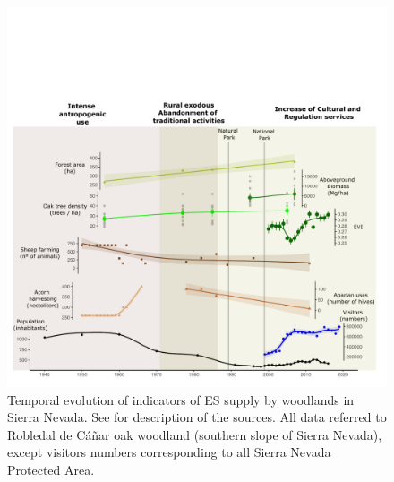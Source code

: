\begin{figure}
    \centering
    \includegraphics[width=.8\textwidth]{img/es/es-temporal_evolution_modified_v1.pdf}
    \caption{Temporal evolution of indicators of ES supply by \Qp woodlands in Sierra Nevada. See  for description of the sources. All data referred to Robledal de Cáñar oak woodland (southern slope of Sierra Nevada), except visitors numbers corresponding to all Sierra Nevada Protected Area.}\label{fig:es:temporal}
\end{figure}

